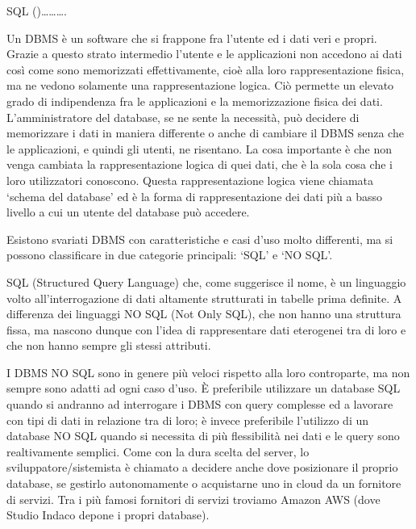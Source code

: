 \documentclass[12pt,a4paper]{article}
\begin{document}
SQL ()……….

Un DBMS è un software che si frappone fra l’utente ed i dati veri e propri. Grazie a questo strato intermedio l’utente e le applicazioni non accedono ai dati così come sono memorizzati effettivamente, cioè alla loro rappresentazione fisica, ma ne vedono solamente una rappresentazione logica. Ciò permette un elevato grado di indipendenza fra le applicazioni e la memorizzazione fisica dei dati. L’amministratore del database, se ne sente la necessità, può decidere di memorizzare i dati in maniera differente o anche di cambiare il DBMS senza che le applicazioni, e quindi gli utenti, ne risentano. La cosa importante è che non venga cambiata la rappresentazione logica di quei dati, che è la sola cosa che i loro utilizzatori conoscono. Questa rappresentazione logica viene chiamata ‘schema del database’ ed è la forma di rappresentazione dei dati più a basso livello a cui un utente del database può accedere.

Esistono svariati DBMS con caratteristiche e casi d’uso molto differenti, ma si possono classificare in due categorie principali: ‘SQL’ e ‘NO SQL’.

SQL (Structured Query Language) che, come suggerisce il nome, è un linguaggio volto all’interrogazione di dati altamente strutturati in tabelle prima definite.
A differenza dei linguaggi NO SQL (Not Only SQL), che non hanno una struttura fissa, ma nascono dunque con l’idea di rappresentare dati eterogenei tra di loro e che non hanno sempre gli stessi attributi.

I DBMS NO SQL sono in genere più veloci rispetto alla loro controparte, ma non sempre sono adatti ad ogni caso d’uso. È preferibile utilizzare un database SQL quando si andranno ad interrogare i DBMS con query complesse ed a lavorare con tipi di dati in relazione tra di loro; è invece preferibile l’utilizzo di un database NO SQL quando si necessita di più flessibilità nei dati e le query sono realtivamente semplici.
Come con la dura scelta del server, lo sviluppatore/sistemista è chiamato a decidere anche dove posizionare il proprio database, se gestirlo autonomamente o acquistarne uno in cloud da un fornitore di servizi. Tra i più famosi fornitori di servizi troviamo Amazon AWS (dove Studio Indaco depone i propri database).
\end{document}

